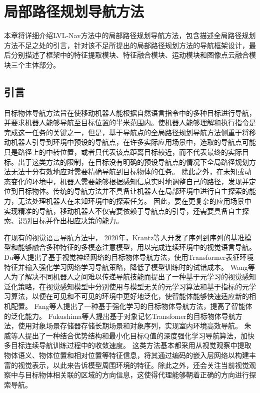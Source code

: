 \chapter{局部路径规划导航方法}
本章将详细介绍LVL-Nav方法中的局部路径规划导航方法，包含描述全局路径规划方法不足之处的引言，针对该不足所提出的局部路径规划方法的导航框架设计，最后分别描述了框架中的特征提取模块、特征融合模块、运动模块和图像点云融合模块三个主体部分。


\section{引言}

目标物体导航方法旨在使移动机器人能根据自然语言指令中的多种目标进行导航，并要求机器人能够导航至目标位置的半米范围内。使机器人能够理解和执行指令是完成这一任务的关键之一，但是，基于导航点的全局路径规划导航方法侧重于将移动机器人引导到环境中预设的导航点，在许多实际应用场景中，选取的导航点可能只是路径上的中转位置，或者只代表该点距离目标较近，而不代表最终的实际目标。出于这类方法的限制，在目标没有明确的预设导航点的情况下全局路径规划方法无法十分有效地应对需要精确导航到目标物体的任务。
除此之外，在未知或动态变化的环境中，机器人需要能够根据感知信息实时地调整自己的路径，发现并定位到目标物体。传统的导航方法并不具备让机器人在局部环境中进行自主探索的能力，无法处理机器人在未知环境中的探索任务。
因此，要在更复杂的应用场景中实现精准的导航，移动机器人不仅需要依赖于导航点的引导，还需要具备自主探索、识别目标并作出相应决策的能力。

在现有的视觉语言导肮方法中，
2020年，Krantz\cite{krantz2020beyond}等人开发了序列到序列的基准模型和能够融合多种特征的多模态注意模型，用以完成连续环境中的视觉语言导航。
Du\cite{du2020learning, du2021vtnet}等人提出了基于视觉神经网络的目标物体导航方法，使用Transformer表征环境特征并输入强化学习网络学习导航策略，降低了模型训练时的试错成本。
Wang\cite{wang2021visual}等人为了解决不同机器人之间难以传递导航技能而提出了一种基于元学习的视觉感知泛化策略，在视觉感知模型中分别使用与模型无关的元学习算法和基于指标的元学习算法，以便在可见和不可见的环境中更好地泛化，使智能体能够快速适应新的相机配置。
Fang\cite{fang2022target}等人提出了一种基于强化学习的目标物体导航方法，提高了智能体的泛化能力。
Fukushima\cite{fukushima2022object}等人提出基于对象记忆Transfomer的目标物体导航方法，使用对象场景存储器存储长期场景和对象序列，实现室内环境高效导航。
朱威\cite{朱威2024结合优势结构和最小目标}等人提出了一种结合优势结构和最小化目标Q值的深度强化学习导航算法，加快多目标连续导航训练过程中的收敛速度。
这类方法基本都采用从视觉观察中提取物体语义、物体位置和相对位置等特征信息，将其通过编码的嵌入层网络以构建丰富的视觉表示，以此来告诉模型周围环境的特征。除此之外，还会关注当前视觉观察中与目标物体相关联的区域的方向信息，这使得代理能够朝着正确的方向进行探索导航。

